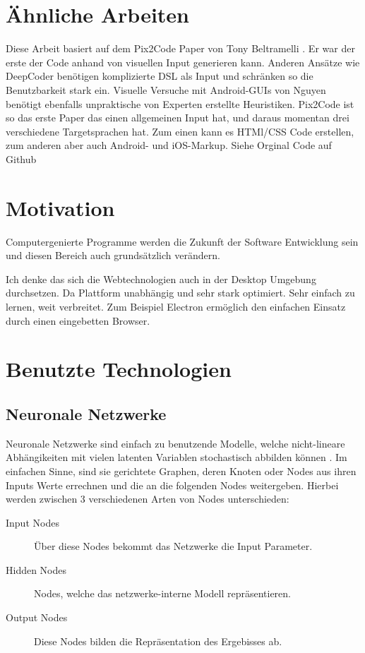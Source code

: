 \documentclass[pdftex,a4paper,halfparskip]{scrartcl}
\begin{document}
\section{Ähnliche Arbeiten}

Diese Arbeit basiert auf dem Pix2Code Paper von Tony Beltramelli \cite{Beltramelli17} . Er war der erste der Code anhand von visuellen Input generieren kann. 
Anderen Ansätze wie DeepCoder \cite{DeepCoder16} benötigen komplizierte DSL als Input und schränken so die Benutzbarkeit stark ein. Visuelle Versuche mit Android-GUIs von Nguyen \cite{Nguyen15} benötigt ebenfalls unpraktische von Experten erstellte Heuristiken. Pix2Code ist so das erste Paper das einen allgemeinen Input hat, und daraus momentan drei verschiedene Targetsprachen hat. Zum einen kann es HTMl/CSS Code erstellen, zum anderen aber auch Android- und iOS-Markup. Siehe Orginal Code auf Github \cite{Beltramelli17Github}


\section{Motivation}
Computergenierte Programme werden die Zukunft der Software Entwicklung sein und diesen Bereich auch grundsätzlich verändern. 

Ich denke das sich die Webtechnologien auch in der Desktop Umgebung durchsetzen.  Da Plattform unabhängig und sehr stark optimiert. Sehr einfach zu lernen, weit verbreitet. Zum Beispiel Electron \cite{electron} ermöglich den einfachen Einsatz durch einen eingebetten Browser.



\section{Benutzte Technologien}
\subsection{Neuronale Netzwerke}
Neuronale Netzwerke sind einfach zu benutzende Modelle, welche nicht-lineare Abhängikeiten mit vielen latenten Variablen stochastisch abbilden können \cite{nnWebsite}. Im einfachen Sinne, sind sie gerichtete Graphen, deren Knoten oder Nodes aus ihren Inputs Werte errechnen und die an die folgenden Nodes weitergeben. Hierbei werden zwischen 3 verschiedenen Arten von Nodes unterschieden:

\begin{description}
	\item[Input Nodes] Über diese Nodes bekommt das Netzwerke die Input Parameter.
	\item[Hidden Nodes] Nodes, welche das netzwerke-interne Modell repräsentieren.
	\item[Output Nodes] Diese Nodes bilden die Repräsentation des Ergebisses ab.
\end{description}
\end{document}
